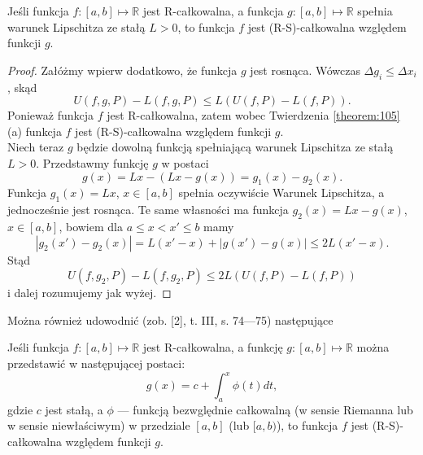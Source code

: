 \documentclass[leqno]{article}
\begin{document}
\begin{justify}
\begin{theorem}
    Jeśli funkcja $f : [a,b] \mapsto \mathbb{R}$ jest R-całkowalna, a funkcja $g : [a,b] \mapsto \mathbb{R}$ spełnia
    warunek Lipschitza ze stałą $L > 0$, to funkcja $f$ jest (R-S)-całkowalna względem funkcji $g$.
\end{theorem}

\newpage
\begin{proof}
    Załóżmy wpierw dodatkowo, że funkcja $g$ jest rosnąca. Wówczas $\Delta g_i \leqslant \Delta x_i$, skąd
    \[
        U(f, g, P) - L(f, g, P) \leqslant L(U(f, P) - L(f, P)).
    \]
    Ponieważ funkcja $f$ jest R-całkowalna, zatem wobec Twierdzenia \ref{theorem:105} (a) funkcja $f$ jest (R-S)-całkowalna względem funkcji $g$. \\
    Niech teraz $g$ będzie dowolną funkcją spełniającą warunek Lipschitza ze stałą $L > 0$. Przedstawmy funkcję $g$ w postaci
    \[
        g(x) = Lx - (Lx - g(x)) = g_1(x) - g_2(x).
    \]
    Funkcja $g_1(x) = Lx$, $x \in [a,b]$ spełnia oczywiście Warunek Lipschitza, a jednocześnie jest rosnąca. Te same własności ma funkcja $g_2(x) = Lx - g(x)$, $x \in [a,b]$,
    bowiem dla $a \leqslant x < x' \leqslant b$ mamy
    \[
        |g_2(x')-g_2(x)| = L(x'-x) + |g(x') - g(x)| \leqslant 2L(x'-x).
    \]
    Stąd 
    \[
        U(f, g_2, P) - L(f, g_2, P) \leqslant 2L(U(f, P) - L(f, P))
    \]
    i dalej rozumujemy jak wyżej.
\end{proof}

Można również udowodnić (zob. [2], t. III, s. 74---75) następujące

\begin{theorem}
{
    Jeśli funkcja $f : [a,b] \mapsto \mathbb{R}$ jest R-całkowalna, a funkcję $g : [a,b] \mapsto \mathbb{R}$ można przedstawić w następującej postaci:
    \[
        g(x) = c + \int_{a}^{x}\phi(t)dt,
    \]
    gdzie $c$ jest stałą, a $\phi$ --- funkcją bezwględnie całkowalną (w sensie Riemanna lub w sensie niewłaściwym) w przedziale $[a,b]$ (lub $[a,b)$),
    to funkcja $f$ jest (R-S)-całkowalna względem funkcji $g$.
}
\end{theorem}


\end{justify}
\end{document}

